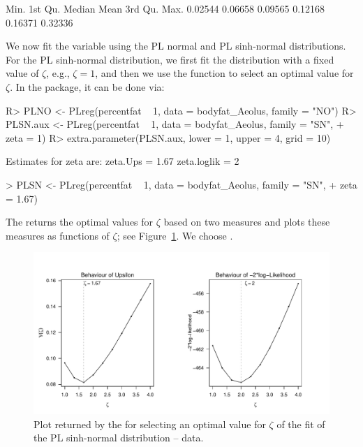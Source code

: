 \begin{Schunk}
\begin{Soutput}
   Min. 1st Qu.  Median    Mean 3rd Qu.    Max. 
0.02544 0.06658 0.09565 0.12168 0.16371 0.32336
\end{Soutput}
\end{Schunk}

We now fit the  variable using the PL normal and PL sinh-normal distributions. For the PL sinh-normal distribution, we first fit the distribution with a fixed value of $\zeta$, e.g., $\zeta = 1$, and then we use the  function to select an optimal value for $\zeta$. In the  package, it can be done via:

\begin{Schunk}
\begin{Sinput}
R> PLNO <- PLreg(percentfat ~ 1, data = bodyfat_Aeolus, family = "NO")
R> PLSN.aux <- PLreg(percentfat ~ 1, data = bodyfat_Aeolus, family = "SN",
+                   zeta = 1)
R> extra.parameter(PLSN.aux, lower = 1, upper = 4, grid = 10)
\end{Sinput}
\begin{Soutput}
Estimates for zeta are: 
zeta.Ups = 1.67
zeta.loglik = 2
\end{Soutput}
\begin{Sinput}
> PLSN <- PLreg(percentfat ~ 1, data = bodyfat_Aeolus, family = "SN",
+               zeta = 1.67)
\end{Sinput}
\end{Schunk}

The  returns the optimal values for $\zeta$ based on two measures and plots these measures as functions of $\zeta$; see Figure~\ref{fig:Fig3}. We choose . 
\begin{figure}[t!]
\centering
\includegraphics[scale=0.6]{figures/Fig3}
\caption{\label{fig:Fig3} Plot returned by the  for selecting an optimal value for $\zeta$ of the fit of the PL sinh-normal distribution --  data.}
\end{figure}

